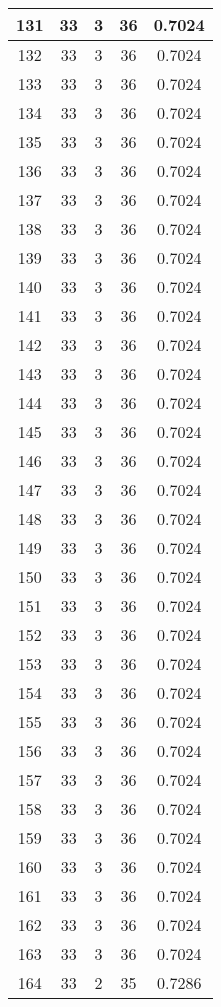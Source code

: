 \documentclass[letterpaper, 12pt]{article}
\begin{document}
\begin{longtable}{|c|c|c|c|c|}
\hline
131 & 33 & 3 & 36 & 0.7024 \\
\hline
132 & 33 & 3 & 36 & 0.7024 \\
\hline
133 & 33 & 3 & 36 & 0.7024 \\
\hline
134 & 33 & 3 & 36 & 0.7024 \\
\hline
135 & 33 & 3 & 36 & 0.7024 \\
\hline
136 & 33 & 3 & 36 & 0.7024 \\
\hline
137 & 33 & 3 & 36 & 0.7024 \\
\hline
138 & 33 & 3 & 36 & 0.7024 \\
\hline
139 & 33 & 3 & 36 & 0.7024 \\
\hline
140 & 33 & 3 & 36 & 0.7024 \\
\hline
141 & 33 & 3 & 36 & 0.7024 \\
\hline
142 & 33 & 3 & 36 & 0.7024 \\
\hline
143 & 33 & 3 & 36 & 0.7024 \\
\hline
144 & 33 & 3 & 36 & 0.7024 \\
\hline
145 & 33 & 3 & 36 & 0.7024 \\
\hline
146 & 33 & 3 & 36 & 0.7024 \\
\hline
147 & 33 & 3 & 36 & 0.7024 \\
\hline
148 & 33 & 3 & 36 & 0.7024 \\
\hline
149 & 33 & 3 & 36 & 0.7024 \\
\hline
150 & 33 & 3 & 36 & 0.7024 \\
\hline
151 & 33 & 3 & 36 & 0.7024 \\
\hline
152 & 33 & 3 & 36 & 0.7024 \\
\hline
153 & 33 & 3 & 36 & 0.7024 \\
\hline
154 & 33 & 3 & 36 & 0.7024 \\
\hline
155 & 33 & 3 & 36 & 0.7024 \\
\hline
156 & 33 & 3 & 36 & 0.7024 \\
\hline
157 & 33 & 3 & 36 & 0.7024 \\
\hline
158 & 33 & 3 & 36 & 0.7024 \\
\hline
159 & 33 & 3 & 36 & 0.7024 \\
\hline
160 & 33 & 3 & 36 & 0.7024 \\
\hline
161 & 33 & 3 & 36 & 0.7024 \\
\hline
162 & 33 & 3 & 36 & 0.7024 \\
\hline
163 & 33 & 3 & 36 & 0.7024 \\
\hline
164 & 33 & 2 & 35 & 0.7286 \\

\end{longtable}
\end{document}
